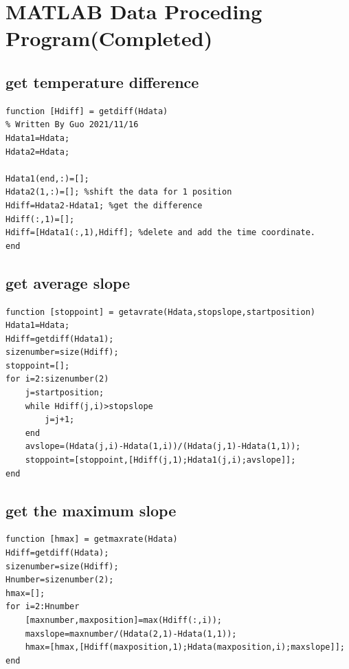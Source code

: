 \documentclass[12pt]{article}
\numberwithin{equation}{section}
\begin{document}
      
\section{MATLAB Data Proceding Program(Completed)}
\subsection{get temperature difference}
\begin{lstlisting}
function [Hdiff] = getdiff(Hdata)
% Written By Guo 2021/11/16 
Hdata1=Hdata;
Hdata2=Hdata;

Hdata1(end,:)=[];
Hdata2(1,:)=[]; %shift the data for 1 position
Hdiff=Hdata2-Hdata1; %get the difference
Hdiff(:,1)=[];   
Hdiff=[Hdata1(:,1),Hdiff]; %delete and add the time coordinate.
end
\end{lstlisting}


\subsection{get average slope}
\begin{lstlisting}
function [stoppoint] = getavrate(Hdata,stopslope,startposition)
Hdata1=Hdata;
Hdiff=getdiff(Hdata1);
sizenumber=size(Hdiff);
stoppoint=[];
for i=2:sizenumber(2)
    j=startposition;
    while Hdiff(j,i)>stopslope
        j=j+1;
    end
    avslope=(Hdata(j,i)-Hdata(1,i))/(Hdata(j,1)-Hdata(1,1));
    stoppoint=[stoppoint,[Hdiff(j,1);Hdata1(j,i);avslope]];
end	
\end{lstlisting}


\subsection{get the maximum slope}
\begin{lstlisting}
function [hmax] = getmaxrate(Hdata)
Hdiff=getdiff(Hdata);
sizenumber=size(Hdiff);
Hnumber=sizenumber(2);
hmax=[];
for i=2:Hnumber
    [maxnumber,maxposition]=max(Hdiff(:,i));
    maxslope=maxnumber/(Hdata(2,1)-Hdata(1,1));
    hmax=[hmax,[Hdiff(maxposition,1);Hdata(maxposition,i);maxslope]];
end	
\end{lstlisting}
\end{document}
